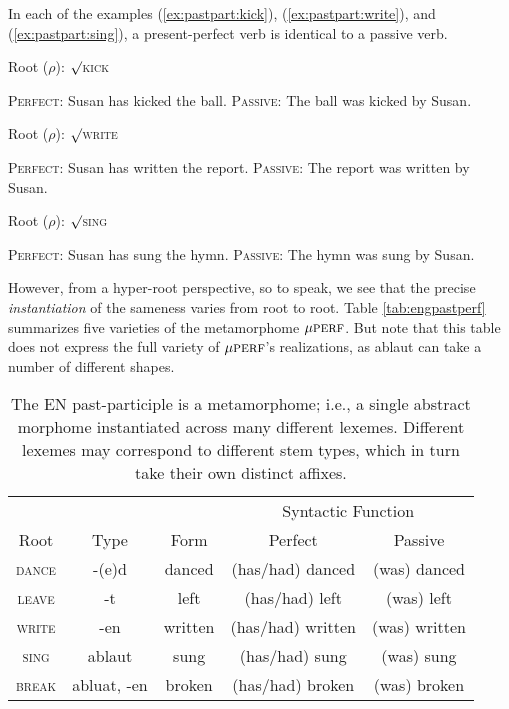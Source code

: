 In each of the examples (\ref{ex:pastpart:kick}), (\ref{ex:pastpart:write}), and (\ref{ex:pastpart:sing}), a present-perfect verb is identical to 
a passive verb.
\begin{exe}
\label{ex:pastpart}
	\ex Root ($\rho$): $\surd$\textsc{kick}
		\begin{xlist} \label{ex:pastpart:kick}
		\ex \textsc{Perfect:} Susan has kicked the ball. \label{ex:pastpart:kick:perf}
		\ex \textsc{Passive:} The ball was kicked by Susan.\label{ex:pastpart:kick:pass}
		\end{xlist}
	\ex Root ($\rho$): $\surd$\textsc{write}
		\begin{xlist} \label{ex:pastpart:write}
		\ex \textsc{Perfect:} Susan has written the report. \label{ex:pastpart:write:perf}
		\ex \textsc{Passive:} The report was written by Susan. \label{ex:pastpart:write:pass}
		\end{xlist}
	\ex Root ($\rho$): $\surd$\textsc{sing}
		\begin{xlist} \label{ex:pastpart:sing}
		\ex \textsc{Perfect:} Susan has sung the hymn. \label{ex:pastpart:sing:perf}
		\ex \textsc{Passive:} The hymn was sung by Susan. \label{ex:pastpart:sing:pass}
		\end{xlist}
\end{exe}
However,
from a hyper-root perspective, so to speak, we see that the precise \emph{instantiation} of the sameness varies from root to root.  
Table \ref{tab:engpastperf} summarizes five varieties of the metamorphome $\mu{\textsc{perf}}$. But note that this table
does not express the full variety of $\mu{\textsc{perf}}$'s realizations, as ablaut can take a number of different shapes.
\begin{table}[ht]
\centering %
\setlength{\extrarowheight}{8pt}
\begin{tabular}{c c c c c} %
\hline
& & & \multicolumn{2}{c}{Syntactic Function} \\[-1ex] 
Root & Type & Form & Perfect & Passive  \\ [0.5ex] %
\hline
\textsc{dance} & -(e)d & danced & (has/had) danced & (was) danced \\
\textsc{leave} & -t & left & (has/had) left & (was) left \\ 
\textsc{write} & -en & written & (has/had) written & (was) written \\
\textsc{sing} & ablaut & sung & (has/had) sung & (was) sung \\
\textsc{break} & abluat, -en & broken & (has/had) broken & (was) broken \\
\hline 
\end{tabular}
\label{tab:engpastpart}
\caption{The \ac{EN} past-participle is a metamorphome; i.e., a single abstract morphome instantiated across many different lexemes. Different lexemes may correspond to different stem types, which in turn take their own distinct affixes.}
\end{table}

